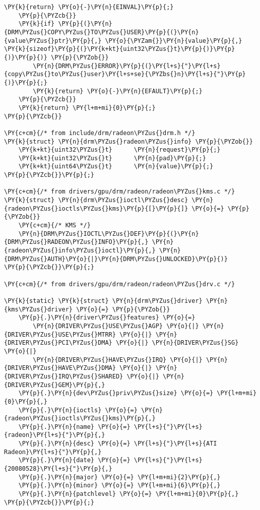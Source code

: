 \begin{Verbatim}[commandchars=\\\{\}]
		\PY{k}{return} \PY{o}{-}\PY{n}{EINVAL}\PY{p}{;}
	\PY{p}{\PYZcb{}}
	\PY{k}{if} \PY{p}{(}\PY{n}{DRM\PYZus{}COPY\PYZus{}TO\PYZus{}USER}\PY{p}{(}\PY{n}{value\PYZus{}ptr}\PY{p}{,} \PY{o}{\PYZam{}}\PY{n}{value}\PY{p}{,} \PY{k}{sizeof}\PY{p}{(}\PY{k+kt}{uint32\PYZus{}t}\PY{p}{)}\PY{p}{)}\PY{p}{)} \PY{p}{\PYZob{}}
		\PY{n}{DRM\PYZus{}ERROR}\PY{p}{(}\PY{l+s}{"}\PY{l+s}{copy\PYZus{}to\PYZus{}user}\PY{l+s+se}{\PYZbs{}n}\PY{l+s}{"}\PY{p}{)}\PY{p}{;}
		\PY{k}{return} \PY{o}{-}\PY{n}{EFAULT}\PY{p}{;}
	\PY{p}{\PYZcb{}}
	\PY{k}{return} \PY{l+m+mi}{0}\PY{p}{;}
\PY{p}{\PYZcb{}}

\PY{c+cm}{/* from include/drm/radeon\PYZus{}drm.h */}
\PY{k}{struct} \PY{n}{drm\PYZus{}radeon\PYZus{}info} \PY{p}{\PYZob{}}
	\PY{k+kt}{uint32\PYZus{}t}		\PY{n}{request}\PY{p}{;}
	\PY{k+kt}{uint32\PYZus{}t}		\PY{n}{pad}\PY{p}{;}
	\PY{k+kt}{uint64\PYZus{}t}		\PY{n}{value}\PY{p}{;}
\PY{p}{\PYZcb{}}\PY{p}{;}

\PY{c+cm}{/* from drivers/gpu/drm/radeon/radeon\PYZus{}kms.c */}
\PY{k}{struct} \PY{n}{drm\PYZus{}ioctl\PYZus{}desc} \PY{n}{radeon\PYZus{}ioctls\PYZus{}kms}\PY{p}{[}\PY{p}{]} \PY{o}{=} \PY{p}{\PYZob{}}
	\PY{c+cm}{/* KMS */}
	\PY{n}{DRM\PYZus{}IOCTL\PYZus{}DEF}\PY{p}{(}\PY{n}{DRM\PYZus{}RADEON\PYZus{}INFO}\PY{p}{,} \PY{n}{radeon\PYZus{}info\PYZus{}ioctl}\PY{p}{,} \PY{n}{DRM\PYZus{}AUTH}\PY{o}{|}\PY{n}{DRM\PYZus{}UNLOCKED}\PY{p}{)}
\PY{p}{\PYZcb{}}\PY{p}{;}

\PY{c+cm}{/* from drivers/gpu/drm/radeon/radeon\PYZus{}drv.c */}

\PY{k}{static} \PY{k}{struct} \PY{n}{drm\PYZus{}driver} \PY{n}{kms\PYZus{}driver} \PY{o}{=} \PY{p}{\PYZob{}}
	\PY{p}{.}\PY{n}{driver\PYZus{}features} \PY{o}{=}
	    \PY{n}{DRIVER\PYZus{}USE\PYZus{}AGP} \PY{o}{|} \PY{n}{DRIVER\PYZus{}USE\PYZus{}MTRR} \PY{o}{|} \PY{n}{DRIVER\PYZus{}PCI\PYZus{}DMA} \PY{o}{|} \PY{n}{DRIVER\PYZus{}SG} \PY{o}{|}
	    \PY{n}{DRIVER\PYZus{}HAVE\PYZus{}IRQ} \PY{o}{|} \PY{n}{DRIVER\PYZus{}HAVE\PYZus{}DMA} \PY{o}{|} \PY{n}{DRIVER\PYZus{}IRQ\PYZus{}SHARED} \PY{o}{|} \PY{n}{DRIVER\PYZus{}GEM}\PY{p}{,}
	\PY{p}{.}\PY{n}{dev\PYZus{}priv\PYZus{}size} \PY{o}{=} \PY{l+m+mi}{0}\PY{p}{,}
	\PY{p}{.}\PY{n}{ioctls} \PY{o}{=} \PY{n}{radeon\PYZus{}ioctls\PYZus{}kms}\PY{p}{,}
	\PY{p}{.}\PY{n}{name} \PY{o}{=} \PY{l+s}{"}\PY{l+s}{radeon}\PY{l+s}{"}\PY{p}{,}
	\PY{p}{.}\PY{n}{desc} \PY{o}{=} \PY{l+s}{"}\PY{l+s}{ATI Radeon}\PY{l+s}{"}\PY{p}{,}
	\PY{p}{.}\PY{n}{date} \PY{o}{=} \PY{l+s}{"}\PY{l+s}{20080528}\PY{l+s}{"}\PY{p}{,}
	\PY{p}{.}\PY{n}{major} \PY{o}{=} \PY{l+m+mi}{2}\PY{p}{,}
	\PY{p}{.}\PY{n}{minor} \PY{o}{=} \PY{l+m+mi}{6}\PY{p}{,}
	\PY{p}{.}\PY{n}{patchlevel} \PY{o}{=} \PY{l+m+mi}{0}\PY{p}{,}
\PY{p}{\PYZcb{}}\PY{p}{;}


\end{Verbatim}
